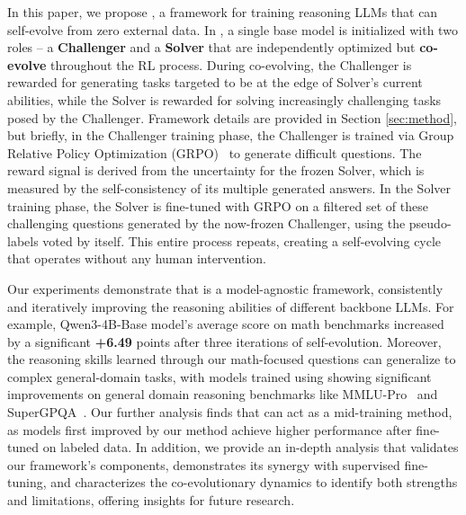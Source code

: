 In this paper, we propose \method{}, a framework for training reasoning LLMs that can self-evolve from zero external data.
In \method{}, a single base model is initialized with two roles -- a \textbf{Challenger} and a \textbf{Solver} that are independently optimized but \textbf{co-evolve} throughout the RL process.
During co-evolving, the Challenger is rewarded for generating tasks targeted to be at the edge of Solver's current abilities, while the Solver is rewarded for solving increasingly challenging tasks posed by the Challenger. Framework details are provided in Section \ref{sec:method}, but briefly, in the Challenger training phase, the Challenger is trained via Group Relative Policy Optimization (GRPO)~\citep{Shao2024DeepSeekMathPT} to generate difficult questions. The reward signal is derived from the uncertainty for the frozen Solver, which is measured by the self-consistency of its multiple generated answers. In the Solver training phase, the Solver is fine-tuned with GRPO on a filtered set of these challenging questions generated by the now-frozen Challenger, using the pseudo-labels voted by itself. This entire process repeats, creating a self-evolving cycle that operates without any human intervention.

Our experiments demonstrate that \method{} is a model-agnostic framework, consistently and iteratively improving the reasoning abilities of different backbone LLMs. For example, Qwen3-4B-Base model's average score on math benchmarks increased by a significant \textbf{+6.49} points after three iterations of self-evolution. Moreover, the reasoning skills learned through our math-focused questions can generalize to complex general-domain tasks, with models trained using \method{} showing significant improvements on general domain reasoning benchmarks like MMLU-Pro~\citep{Wang2024MMLUProAM} and SuperGPQA~\citep{Team2025SuperGPQASL}. Our further analysis finds that \method{} can act as a mid-training method, as models first improved by our method achieve higher performance after fine-tuned on labeled data.
In addition, we provide an in-depth analysis that validates our framework's components, demonstrates its synergy with supervised fine-tuning, and characterizes the co-evolutionary dynamics to identify both strengths and limitations, offering insights for future research.
